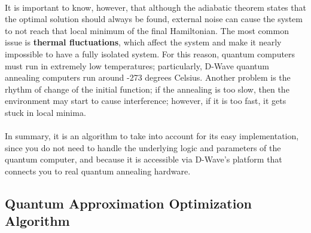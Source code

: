 \documentclass[11pt]{article}
\begin{document}
\\
It is important to know, however, that although the adiabatic theorem states that the optimal solution should always be found, external noise can cause the system to not reach that local minimum of the final Hamiltonian. The most common issue is \textbf{thermal fluctuations}, which affect the system and make it nearly impossible to have a fully isolated system. For this reason, quantum computers must run in extremely low temperatures; particularly, D-Wave quantum annealing computers run around -273 degrees Celsius. Another problem is the rhythm of change of the initial function; if the annealing is too slow, then the environment may start to cause interference; however, if it is too fast, it gets stuck in local minima.\\
\\
In summary, it is an algorithm to take into account for its easy implementation, since you do not need to handle the underlying logic and parameters of the quantum computer, and because it is accessible via D-Wave's platform that connects you to real quantum annealing hardware.

\subsection{Quantum Approximation Optimization Algorithm}
\end{document}
